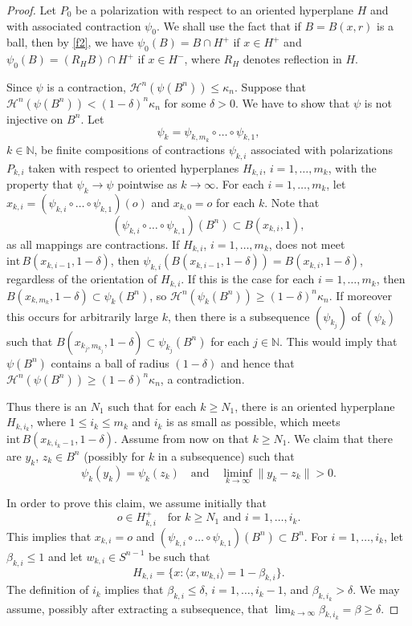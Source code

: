 \documentclass[12pt,reqno]{amsart}
\newcommand{\N}{{\mathbb N}}
\newcommand{\cH}{{\mathcal H}}
\newcommand{\inte}{{\mathrm{int}}\,}
\numberwithin{equation}{section}
\begin{document}
\begin{proof}
Let $P_0$ be a polarization with respect to an oriented hyperplane $H$ and with associated contraction $\psi_0$.  We shall use the fact that if $B=B(x,r)$ is a ball, then by \eqref{f2}, we have $\psi_0(B)=B\cap H^+$ if $x\in H^+$ and $\psi_0(B)=(R_HB)\cap H^+$ if $x\in H^-$, where $R_H$ denotes reflection in $H$.

Since $\psi$ is a contraction, ${\cH}^n(\psi(B^n))\leq\kappa_n$. Suppose that ${\cH}^n(\psi(B^n))<(1-\delta)^{n}\kappa_n$ for some $\delta>0$. We have to show that $\psi$ is not injective on $B^n$. Let
\[
\psi_k=\psi_{k,m_k}\circ\dots\circ\psi_{k,1},
\]
$k\in \N$, be finite compositions of contractions $\psi_{k,i}$ associated with polarizations $P_{k,i}$ taken with respect to oriented hyperplanes $H_{k,i}$, $i=1,\dots,m_k$, with the property that $\psi_k\to \psi$ pointwise as $k\to\infty$.
For each $i=1,\dots,m_k$, let $x_{k,i}=(\psi_{k,i}\circ\dots\circ \psi_{k,1})(o)$ and $x_{k,0}=o$ for each $k$. Note that
\[
(\psi_{k,i}\circ\dots\circ \psi_{k,1})(B^n)\subset B(x_{k,i},1),
\]
as all mappings are contractions.  If $H_{k,i}$, $i=1,\dots,m_k$, does not meet $\inte B(x_{k,i-1},1-\delta)$, then $\psi_{{k,i}}({B(x_{k,i-1},1-\delta)})={B(x_{k,i},1-\delta)}$, regardless of the orientation of $H_{k,i}$.  If this is the case for each $i=1,\dots,m_k$, then ${B(x_{k,m_k},1-\delta)}\subset\psi_k(B^n)$, so ${\cH}^n(\psi_k(B^n))\ge (1-\delta)^{{n}}\kappa_n$. If moreover this occurs for arbitrarily large $k$, then there is a subsequence $(\psi_{k_j})$ of $(\psi_k)$ such that ${B(x_{k_j,m_{k_j}},1-\delta)}\subset\psi_{k_j}(B^n)$ for each $j\in \N$.  This would imply that $\psi(B^n)$ contains a ball of radius $(1-\delta)$ and hence that ${\cH}^n(\psi(B^n))\ge (1-\delta)^{{n}}\kappa_n$, a contradiction.

Thus there is an $N_1$ such that for each $k\ge N_1$, there is an oriented hyperplane $H_{k,i_k}$, where $1\le i_k\le m_k$ and $i_k$ is as small as possible, which meets $\inte {B(x_{k,i_k-1},1-\delta)}$. Assume from now on that $k\ge N_1$. We claim that there are $y_k$, $z_k\in B^n$ (possibly for $k$ in a subsequence) such that
\begin{equation}\label{non_inject_k}
 \psi_k(y_k)=\psi_k(z_k)\quad\text{and}\quad \liminf_{k\to\infty}\|y_k-z_k\|> 0.
\end{equation}

In order to prove this claim, we assume initially that
\begin{equation}\label{oinpositivehalfsp}
o\in H_{k,i}^+\quad\text{for $k\geq N_1$ and $i=1,\dots,i_k$.}
\end{equation}
This implies that $x_{k,i}=o$ and
$(\psi_{k,i}\circ\dots\circ \psi_{k,1})(B^n)\subset B^n$.
For $i=1,\dots,i_k$, let $\beta_{k,i}\le 1$ and let $w_{k,i}\in S^{n-1}$ be such that
\[
H_{k,i}=\{x : \langle x,w_{k,i}\rangle=1-\beta_{k,i}\}.
\]
The definition of $i_k$ implies that $\beta_{k,i}\leq\delta$, $i=1,\dots,i_k-1$, and $\beta_{k,i_k}>\delta$. We may assume, possibly after extracting a subsequence, that $\lim_{k\to\infty}\beta_{k,i_k}=\beta\geq\delta$.


\end{proof}
\end{document}
